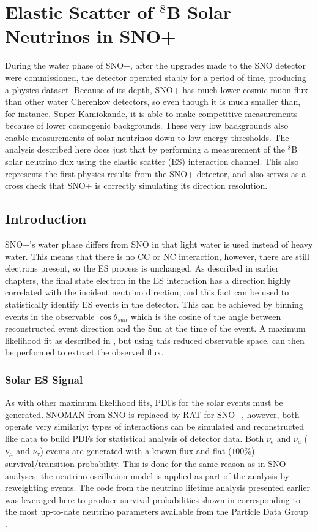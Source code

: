 \chapter{Elastic Scatter of $^8$B Solar Neutrinos in SNO+}
\label{ch:es}

During the water phase of SNO+, after the upgrades made to the SNO detector were commissioned, the detector operated stably for a period of time, producing a physics dataset.
Because of its depth, SNO+ has much lower cosmic muon flux than other water Cherenkov detectors, so even though it is much smaller than, for instance, Super Kamiokande, it is able to make competitive measurements because of lower cosmogenic backgrounds.
These very low backgrounds also enable measurements of solar neutrinos down to low energy thresholds.
The analysis described here does just that by performing a measurement of the $^8$B solar neutrino flux using the elastic scatter (ES) interaction channel.
This also represents the first physics results from the SNO+ detector, and also serves as a cross check that SNO+ is correctly simulating its direction resolution.

\section{Introduction}
\label{sec:solar:intro}

SNO+'s water phase differs from SNO in that light water is used instead of heavy water.
This means that there is no CC or NC interaction, however, there are still electrons present, so the ES process is unchanged.
As described in earlier chapters, the final state electron in the ES interaction has a direction highly correlated with the incident neutrino direction, and this fact can be used to statistically identify ES events in the detector.
This can be achieved by binning events in the observable $\cos{\theta_{sun}}$ which is the cosine of the angle between reconstructed event direction and the Sun at the time of the event.
A maximum likelihood fit as described in , but using this reduced observable space, can then be performed to extract the observed flux.

\subsection{Solar ES Signal}
\label{sec:solar:inputs}

As with other maximum likelihood fits, PDFs for the solar events must be generated.
SNOMAN from SNO is replaced by RAT for SNO+, however, both operate very similarly: types of interactions can be simulated and reconstructed like data to build PDFs for statistical analysis of detector data.
Both $\nu_e$ and $\nu_a$ ($\nu_\mu$ and $\nu_\tau$) events are generated with a known flux and flat ($100\%$) survival/transition probability.
This is done for the same reason as in SNO analyses: the neutrino oscillation model is applied as part of the analysis by reweighting events.
The code from the neutrino lifetime analysis presented earlier was leveraged here to produce survival probabilities shown in  corresponding to the most up-to-date neutrino parameters available from the Particle Data Group \cite{pdg}.

